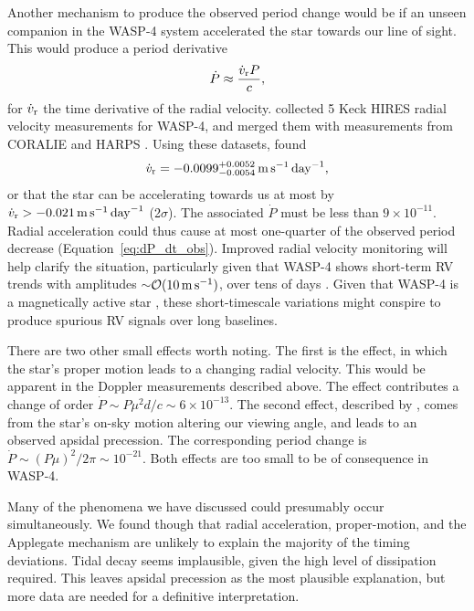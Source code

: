 \documentclass[12pt,twocolumn,tighten]{aastex62}
\begin{document}
Another mechanism to produce the observed period change would be if an
unseen companion in the WASP-4 system accelerated the star towards our
line of sight.
This would produce a period derivative
\begin{equation}
	\dot{P} \approx \frac{\dot{v}_{\rm r} P}{c},
\end{equation}
for $\dot{v}_{\rm r}$ the time derivative of the radial velocity.
\citet{knutson_friends_2014} collected 5 Keck HIRES radial
velocity measurements for WASP-4, and merged them with measurements
from CORALIE and HARPS \citep{wilson_wasp-4b_2008,pont_determining_2011,husnoo_observational_2012}.
Using these datasets, \citet{knutson_friends_2014} found 
\begin{equation}
\dot{v}_{\rm r} =
   -0.0099^{+0.0052}_{-0.0054}
   \,{\rm m}\,{\rm s}^{-1}\,{\rm day}^{-1},
\end{equation}
or that the
star can be accelerating towards us at most by $\dot{v}_{\rm r} > -
0.021 \,{\rm m}\,{\rm s}^{-1}\,{\rm day}^{-1}$ (2$\sigma$).
The associated $\dot{P}$ must be less than $9\times 10^{-11}$.  
Radial acceleration could thus cause at most one-quarter of the
observed period decrease (Equation~\ref{eq:dP_dt_obs}).
Improved radial velocity
monitoring will help clarify the situation,
particularly given that WASP-4 shows short-term RV trends with
amplitudes $\sim$$\mathcal{O}(10\,{\rm m\,s}^{-1})$, over tens of days
\citep{husnoo_observational_2012}.  Given that WASP-4 is a
magnetically active star \citep{sanchis-ojeda_starspots_2011}, these
short-timescale variations might conspire to produce spurious
RV signals over long baselines.

There are two other small effects worth noting.  The first is the
\citet{shklovskii_possible_1970} effect, in which the star's proper
motion leads to a changing radial velocity.  This would be apparent in
the Doppler measurements described above.  The effect contributes a
change of order $\dot{P} \sim P\mu^2 d/ c \sim 6\times10^{-13}$.  The
second effect, described by \citet{rafikov_stellar_2009}, comes from
the star's on-sky motion altering our viewing angle, and leads to an
observed apsidal precession.  The corresponding period change is
$\dot{P} \sim (P\mu)^2/2\pi \sim 10^{-21}$. Both effects are too small
to be of consequence in WASP-4.

Many of the phenomena we have discussed could presumably occur
simultaneously.  We found though that radial acceleration,
proper-motion, and the Applegate mechanism are unlikely to explain the
majority of the timing deviations.  Tidal decay seems implausible,
given the high level of dissipation required.  This leaves apsidal
precession as the most plausible explanation, but more data are needed
for a definitive interpretation.
\end{document}
